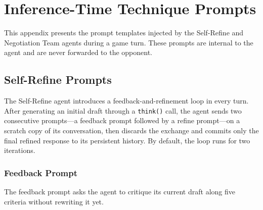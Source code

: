 \chapter{Inference-Time Technique Prompts} \label{ap1:it-prompts}

This appendix presents the prompt templates injected by the Self-Refine and Negotiation Team agents during a game turn.
These prompts are internal to the agent and are never forwarded to the opponent.


\section{Self-Refine Prompts}
\label{ap1:sr-prompts}

The Self-Refine agent \parencite{madaan_self-refine_2023} introduces a feedback-and-refinement loop in every turn.
After generating an initial draft through a \texttt{think()} call, the agent sends two consecutive prompts---a feedback prompt followed by a refine prompt---on a scratch copy of its conversation, then discards the exchange and commits only the final refined response to its persistent history.
By default, the loop runs for two iterations.

\subsection{Feedback Prompt}

The feedback prompt asks the agent to critique its current draft along five criteria without rewriting it yet.

